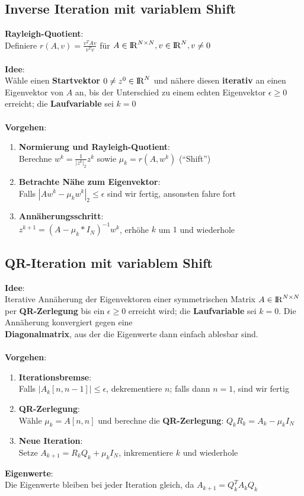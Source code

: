 \documentclass[10pt,a4paper]{article}
\def\realnumbers{{\rm I\!R}}
\newcommand{\quotestyle}[1]{\enquote{#1}}
\begin{document}
	\subsection{Inverse Iteration mit variablem Shift}
	\textbf{Rayleigh-Quotient}:\\Definiere $r(A, v) = \frac{v^TAv}{v^Tv}$ für $A \in \realnumbers^{N\times N}, v \in \realnumbers^N, v \neq 0$\\\\
	\textbf{Idee}:\\Wähle einen \textbf{Startvektor} $0 \neq z^0 \in \realnumbers^N$ und nähere diesen \textbf{iterativ} an einen Eigenvektor von $A$ an, bis der Unterschied zu einem echten Eigenvektor $\epsilon \geq 0$ erreicht; die \textbf{Laufvariable} sei $k = 0$\\\\
	\textbf{Vorgehen}:
	\begin{enumerate}
		\item \textbf{Normierung und Rayleigh-Quotient}:\\Berechne $w^k = \frac{1}{|z^k|_2}z^k$ sowie $\mu_k = r(A, w^k)$ (\quotestyle{Shift})
		\item \textbf{Betrachte Nähe zum Eigenvektor}:\\Falls $|Aw^k - \mu_k w^k|_2 \leq \epsilon$ sind wir fertig, ansonsten fahre fort
		\item \textbf{Annäherungsschritt}:\\$z^{k+1} = (A - \mu_k * I_N)^{-1}w^k$, erhöhe $k$ um $1$ und wiederhole
	\end{enumerate}

	\newpage
	\subsection{QR-Iteration mit variablem Shift}
	\textbf{Idee}:\\Iterative Annäherung der Eigenvektoren einer symmetrischen Matrix $A \in \realnumbers^{N\times N}$ per \textbf{QR-Zerlegung} bis ein $\epsilon \geq 0$ erreicht wird; die \textbf{Laufvariable} sei $k = 0$. Die Annäherung konvergiert gegen eine\\\textbf{Diagonalmatrix}, aus der die Eigenwerte dann einfach ablesbar sind.\\\\
	\textbf{Vorgehen}:
	\begin{enumerate}
		\item \textbf{Iterationsbremse}:\\Falls $|A_k[n, n-1]| \leq \epsilon$, dekrementiere $n$; falls dann $n = 1$, sind wir fertig
		\item \textbf{QR-Zerlegung}:\\Wähle $\mu_k = A[n,n]$ und berechne die \textbf{QR-Zerlegung}: $Q_kR_k = A_k - \mu_kI_N$
		\item \textbf{Neue Iteration}:\\Setze $A_{k+1} = R_kQ_k + \mu_kI_N$, inkrementiere $k$ und wiederhole
	\end{enumerate}
	\textbf{Eigenwerte}:\\Die Eigenwerte bleiben bei jeder Iteration gleich, da $A_{k + 1} = Q_k^TA_kQ_k$
\end{document}
